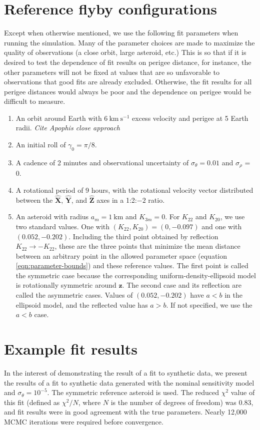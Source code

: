\documentclass{aastex631}
\newcommand{\unit}[1]{\hat{\mathbf{#1}}}
\newcommand{\jtd}[1]{{\color{red}\textit{#1}}}
\newcommand{\siunit}[1]{\ \textrm{#1}}
\newcommand{\per}[1]{\ \textrm{#1}^{-1}}
\begin{document}
\section{Reference flyby configurations}
\label{app:reference-config}
Except when otherwise mentioned, we use the following fit parameters when running the simulation. Many of the parameter choices are made to maximize the quality of observations (a close orbit, large asteroid, etc.) This is so that if it is desired to test the dependence of fit results on perigee distance, for instance, the other parameters will not be fixed at values that are so unfavorable to observations that good fits are already excluded. Otherwise, the fit results for all perigee distances would always be poor and the dependence on perigee would be difficult to measure.
\begin{enumerate}
  \item An orbit around Earth with $6\siunit{km}\per{s}$ excess velocity and perigee at 5 Earth radii. \jtd{Cite Apophis close approach}
  \item An initial roll of $\gamma_0=\pi/8$.
  \item A cadence of 2 minutes and observational uncertainty of $\sigma_\theta = 0.01$ and $\sigma_\rho$ = 0.
  \item A rotational period of 9 hours, with the rotational velocity vector distributed between the $\unit X$, $\unit Y$, and $\unit Z$ axes in a 1:2:$-2$ ratio.
  \item An asteroid with radius $a_m = 1\siunit{km}$ and $K_{3m}=0$. For $K_{22}$ and $K_{20}$, we use two standard values. One with $(K_{22}, K_{20}) = (0, -0.097)$ and one with $(0.052, -0.202)$. Including the third point obtained by reflection $K_{22}\rightarrow -K_{22}$, these are the three points that minimize the mean distance between an arbitrary point in the allowed parameter space (equation \ref{eqn:parameter-bounds}) and these reference values. The first point is called the symmetric case because the corresponding uniform-density-ellipsoid model is rotationally symmetric around $\unit z$. The second case and its reflection are called the asymmetric cases. Values of $(0.052, -0.202)$ have $a < b$ in the ellipsoid model, and the reflected value has $a > b$. If not specified, we use the $a < b$ case. 
\end{enumerate}



\section{Example fit results}
In the interest of demonstrating the result of a fit to synthetic data, we present the results of a fit to synthetic data generated with the nominal sensitivity model and $\sigma_\theta = 10^{-5}$. The symmetric reference asteroid is used. The reduced $\chi^2$ value of this fit (defined as $\chi^2 / N$, where $N$ is the number of degrees of freedom) was 0.83, and fit results were in good agreement with the true parameters. Nearly 12,000 MCMC iterations were required before convergence.
\end{document}
